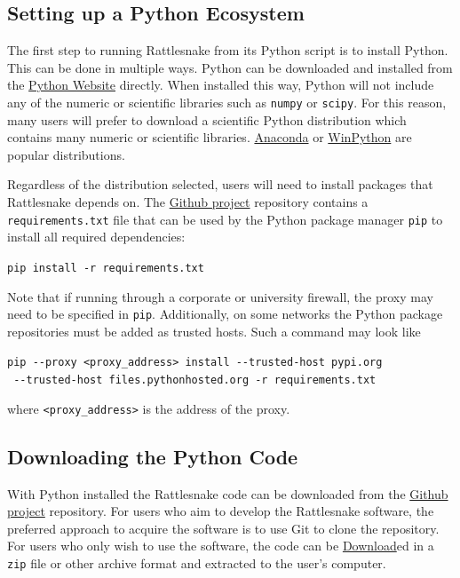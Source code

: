 \documentclass[pdf,12pt,report]{SANDreport}
\newcommand{\inlineCode}{\lstinline[basicstyle=\bfseries\ttfamily]}
\newcommand{\GitlabProject}{\href{https://github.com/sandialabs/rattlesnake-vibration-controller}{Github project}}
\newcommand{\GitlabMasterDownload}{\href{https://github.com/sandialabs/rattlesnake-vibration-controller/archive/refs/heads/main.zip}{Download}}
\begin{document}
    \subsection{Setting up a Python Ecosystem}
    The first step to running Rattlesnake from its Python script is to install Python.  This can be done in multiple ways.  Python can be downloaded and installed from the \href{https://www.python.org/}{Python Website} directly.  When installed this way, Python will not include any of the numeric or scientific libraries such as \inlineCode{numpy} or \inlineCode{scipy}.  For this reason, many users will prefer to download a scientific Python distribution which contains many numeric or scientific libraries.  \href{https://www.anaconda.com/}{Anaconda} or \href{https://winpython.github.io/}{WinPython} are popular distributions.
    
    Regardless of the distribution selected, users will need to install packages that Rattlesnake depends on.  The \GitlabProject{} repository contains a \inlineCode{requirements.txt} file that can be used by the Python package manager \inlineCode{pip} to install all required dependencies:
    \begin{center}
        \inlineCode{pip install -r requirements.txt}
    \end{center}
    
    Note that if running through a corporate or university firewall, the proxy may need to be specified in \inlineCode{pip}.  Additionally, on some networks the Python package repositories must be added as trusted hosts.  Such a command may look like
    \begin{center}
        \inlineCode{pip --proxy <proxy_address> install --trusted-host pypi.org}\\ \inlineCode{ --trusted-host files.pythonhosted.org -r requirements.txt}
    \end{center}
    where \inlineCode{<proxy_address>} is the address of the proxy.
    
    \subsection{Downloading the Python Code}
    
    With Python installed the Rattlesnake code can be downloaded from the \GitlabProject{} repository.  For users who aim to develop the Rattlesnake software, the preferred approach to acquire the software is to use Git to clone the repository.  For users who only wish to use the software, the code can be \GitlabMasterDownload ed in a \inlineCode{zip} file or other archive format and extracted to the user's computer.  
    
\end{document}
